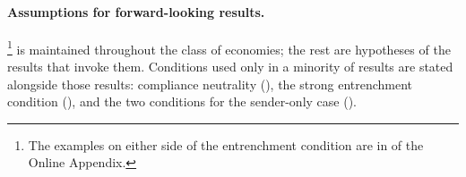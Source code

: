 \paragraph{Assumptions for forward-looking results.}
\footnote{The examples on either side of the
entrenchment condition are in  of the
Online Appendix.}  is maintained throughout the class of
economies; the rest are hypotheses of the results that invoke them. Conditions used
only in a minority of results are stated alongside those results: compliance
neutrality (), the strong entrenchment condition
(), and the two conditions for the sender-only case
().

